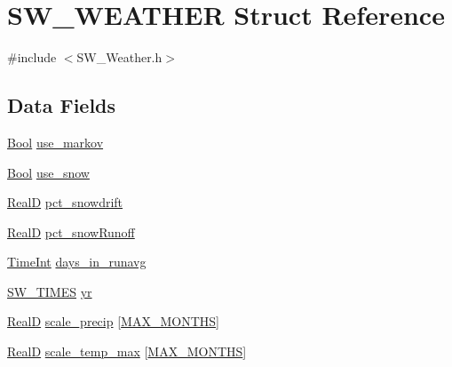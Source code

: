 \hypertarget{struct_s_w___w_e_a_t_h_e_r}{}\section{S\+W\+\_\+\+W\+E\+A\+T\+H\+ER Struct Reference}
\label{struct_s_w___w_e_a_t_h_e_r}


{\ttfamily \#include $<$S\+W\+\_\+\+Weather.\+h$>$}

\subsection*{Data Fields}
\begin{DoxyCompactItemize}
\item 
\hyperlink{generic_8h_a39db6982619d623273fad8a383489309}{Bool} \hyperlink{struct_s_w___w_e_a_t_h_e_r_ab5b33c69a26fbf22fa42129cf23b16ee}{use\+\_\+markov}
\item 
\hyperlink{generic_8h_a39db6982619d623273fad8a383489309}{Bool} \hyperlink{struct_s_w___w_e_a_t_h_e_r_a6600260e93c46b9f8919838a32c9b389}{use\+\_\+snow}
\item 
\hyperlink{generic_8h_af1c105fd5732f70b91ddaeda0cc340e3}{RealD} \hyperlink{struct_s_w___w_e_a_t_h_e_r_aba4ea01a4266e202f3186e3ec575ce32}{pct\+\_\+snowdrift}
\item 
\hyperlink{generic_8h_af1c105fd5732f70b91ddaeda0cc340e3}{RealD} \hyperlink{struct_s_w___w_e_a_t_h_e_r_a4526d6a3fa640bd31a13c32dfc570c08}{pct\+\_\+snow\+Runoff}
\item 
\hyperlink{_times_8h_a25ac787161a5cad0e3fdfe5a5aeb3236}{Time\+Int} \hyperlink{struct_s_w___w_e_a_t_h_e_r_aaf64b49da6982da69e2c4e2da6b49543}{days\+\_\+in\+\_\+runavg}
\item 
\hyperlink{struct_s_w___t_i_m_e_s}{S\+W\+\_\+\+T\+I\+M\+ES} \hyperlink{struct_s_w___w_e_a_t_h_e_r_aace2db7867c79b8fc73174d7b424e8a4}{yr}
\item 
\hyperlink{generic_8h_af1c105fd5732f70b91ddaeda0cc340e3}{RealD} \hyperlink{struct_s_w___w_e_a_t_h_e_r_a2170f122c587227dac45c3a43e7b8c95}{scale\+\_\+precip} \mbox{[}\hyperlink{_times_8h_a9c97e6841188b672e984a4eba7479277}{M\+A\+X\+\_\+\+M\+O\+N\+T\+HS}\mbox{]}
\item 
\hyperlink{generic_8h_af1c105fd5732f70b91ddaeda0cc340e3}{RealD} \hyperlink{struct_s_w___w_e_a_t_h_e_r_a80cb12da6a34d3788ab56d0a75a5cb95}{scale\+\_\+temp\+\_\+max} \mbox{[}\hyperlink{_times_8h_a9c97e6841188b672e984a4eba7479277}{M\+A\+X\+\_\+\+M\+O\+N\+T\+HS}\mbox{]}
\item 

\end{DoxyCompactItemize}
